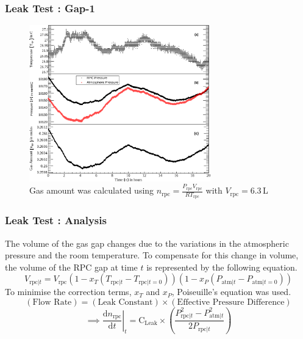 \documentclass{beamer}
\begin{document}
\begin{frame}
  \frametitle{Leak Test : Gap-1}
  \begin{figure}[!h]
    \includegraphics[width=0.7\textwidth]{all_57_gen.png}
    \vspace{-8pt}
    \caption{Gas amount was calculated using $n_{\text{rpc}}=\frac{P_{\text{rpc}}V_{\text{rpc}}}{RT_{\text{rpc}}}$ with $V_{\text{rpc}}=6.3$\,L}
  \end{figure}
\end{frame}

\begin{frame}
  \frametitle{Leak Test : Analysis}
  The volume of the gas gap changes due to the variations in the
  atmospheric pressure and the room temperature. To compensate for
  this change in volume, the volume of the RPC gap at time $t$ is
  represented by the following equation.
  \[V_{\textrm{rpc}|t} = V_{\textrm{rpc}}\left(1-x_T\left(T_{\textrm{rpc}|t}-T_{\textrm{rpc}|t=0}\right)\right)\left(1-x_P\left(P_{\textrm{atm}|t}-P_{\textrm{atm}|t=0}\right)\right)\]
  To minimise the correction terms, $x_T$ and $x_P$, Poiseuille's
  equation was used.
  \[\left(\text{Flow Rate}\right)=\left(\text{Leak Constant}\right)\times\left(\text{Effective Pressure Difference}\right)\]
  \[\implies\left.\frac{\mathrm{d}n_{\textrm{rpc}}}{\mathrm{d}t}\right| _t=\textrm{C}_{\textrm{Leak}}\times\left(\frac {P_{{\textrm{rpc}|t} }^{2}-P_{{\textrm{atm}|t} }^{2}}{2P_{{\textrm{rpc}|t} }}\right)\]
\end{frame}
\end{document}
